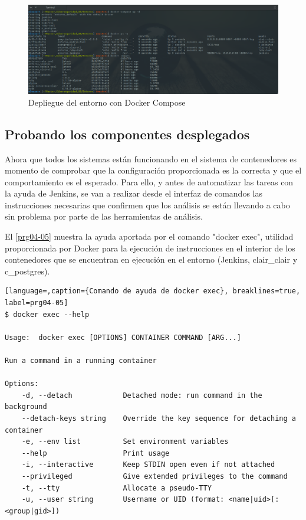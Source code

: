 \begin{figure}[htbp]
	\centering
	\includegraphics[width=1.0\linewidth]
	{desarrollo/figuras/docker-compose-up.png}
	\caption{Depliegue del entorno con Docker Compose}
	\label{compose}
\end{figure}

\subsection{Probando los componentes desplegados}

Ahora que todos los sistemas están funcionando en el sistema de contenedores es momento de comprobar que la configuración proporcionada es la correcta y que el comportamiento es el esperado. Para ello, y antes de automatizar las tareas con la ayuda de Jenkins, se van a realizar desde el interfaz de comandos las instrucciones necesarias que confirmen que los análisis se están llevando a cabo sin problema por parte de las herramientas de análisis.

El \autoref{prg04-05} muestra la ayuda aportada por el comando "docker exec", utilidad proporcionada por Docker para la ejecución de instrucciones en el interior de los contenedores que se encuentran en ejecución en el entorno (Jenkins, clair\_clair y c\_postgres).

\begin{lstlisting}[language=,caption={Comando de ayuda de docker exec}, breaklines=true, label=prg04-05]
$ docker exec --help

Usage:	docker exec [OPTIONS] CONTAINER COMMAND [ARG...]

Run a command in a running container

Options:
	-d, --detach            Detached mode: run command in the background
	--detach-keys string   	Override the key sequence for detaching a container
	-e, --env list          Set environment variables
	--help                 	Print usage
	-i, --interactive       Keep STDIN open even if not attached
	--privileged           	Give extended privileges to the command
	-t, --tty               Allocate a pseudo-TTY
	-u, --user string       Username or UID (format: <name|uid>[:<group|gid>])
\end{lstlisting}

